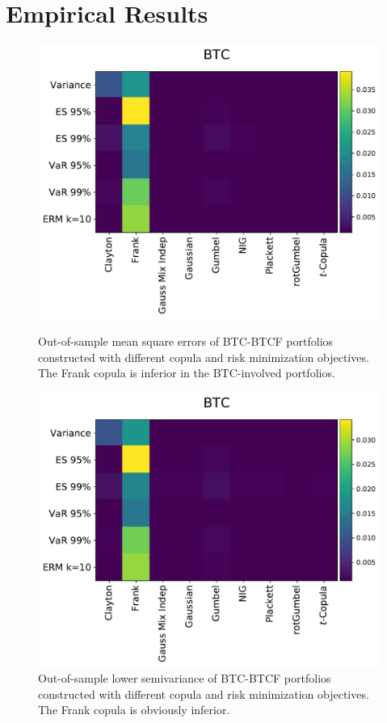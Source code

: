 \section{Empirical Results}\label{sec:results}

\begin{figure}[t]
\centering
\begin{minipage}[t]{.475\textwidth}
    \centering
    \includegraphics[width=\textwidth]{_pics/MSE_BTC.pdf}
  \caption{Out-of-sample mean square errors of BTC-BTCF portfolios constructed with different copula and risk minimization objectives.
    The Frank copula is inferior in the BTC-involved portfolios.}
\label{fig:MSE_BTC}
\end{minipage}
\hfill
\begin{minipage}[t]{.475\textwidth}
    \centering
    \includegraphics[width=\textwidth]{_pics/semiLowerVariance_BTC.pdf}
  \caption{Out-of-sample lower semivariance of BTC-BTCF portfolios constructed with different copula and risk minimization objectives.
  The Frank copula is obviously inferior.}
\label{fig:SLV_BTC}
\end{minipage}
\end{figure}
